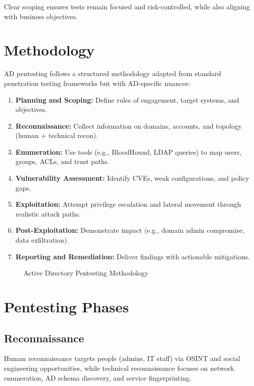 Clear scoping ensures tests remain focused and risk-controlled, while also aligning with business objectives.

\section{Methodology}
AD pentesting follows a structured methodology adapted from standard penetration testing frameworks but with AD-specific nuances:

\begin{enumerate}
  \item \textbf{Planning and Scoping:} Define rules of engagement, target systems, and objectives.
  \item \textbf{Reconnaissance:} Collect information on domains, accounts, and topology (human + technical recon).
  \item \textbf{Enumeration:} Use tools (e.g., BloodHound, LDAP queries) to map users, groups, ACLs, and trust paths.
  \item \textbf{Vulnerability Assessment:} Identify CVEs, weak configurations, and policy gaps.
  \item \textbf{Exploitation:} Attempt privilege escalation and lateral movement through realistic attack paths.
  \item \textbf{Post-Exploitation:} Demonstrate impact (e.g., domain admin compromise, data exfiltration).
  \item \textbf{Reporting and Remediation:} Deliver findings with actionable mitigations.
\end{enumerate}

\begin{figure}[htbp]
  \justifying
  \caption{Active Directory Pentesting Methodology}
  \label{fig:ad-pentesting-methodology}
\end{figure}

\section{Pentesting Phases}
\subsection{Reconnaissance}
Human reconnaissance targets people (admins, IT staff) via OSINT and social engineering opportunities, while technical reconnaissance focuses on network enumeration, AD schema discovery, and service fingerprinting.

